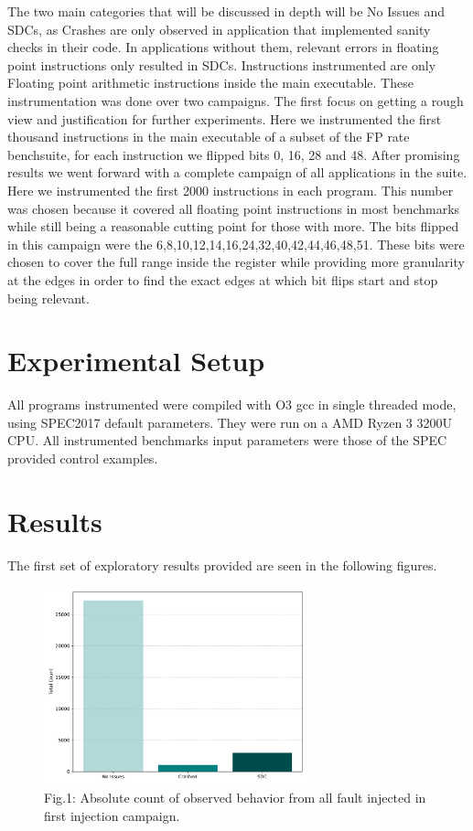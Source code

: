 \documentclass[lettersize,journal]{IEEEtran}
\begin{document}
The two main categories that will be discussed in depth will be No Issues and SDCs, as Crashes are only observed in application that implemented sanity checks in their code. In applications without them, relevant errors in floating point instructions only resulted in SDCs.
Instructions instrumented are only Floating point arithmetic instructions inside the main executable. These instrumentation was done over two campaigns. The first focus on getting a rough view and justification for further experiments. Here we instrumented the first thousand instructions in the main executable of a subset of the FP rate benchsuite, for each instruction we flipped bits 0, 16, 28 and 48. After promising results we went forward with a complete campaign of all applications in the suite. Here we instrumented the first 2000 instructions in each program. This number was chosen because it covered all floating point instructions in most benchmarks while still being a reasonable cutting point for those with more. The bits flipped in this campaign were the 6,8,10,12,14,16,24,32,40,42,44,46,48,51. These bits were chosen to cover the full range inside the register while providing more granularity at the edges in order to find the exact edges at which bit flips start and stop being relevant.
\section{Experimental Setup}
All programs instrumented were compiled with O3 gcc in single threaded mode, using SPEC2017 default parameters. They were run on a AMD Ryzen 3 3200U CPU. All instrumented benchmarks input parameters were those of the SPEC provided control examples. 

\section{Results}
The first set of exploratory results provided are seen in the following figures.

\begin{figure}[!t]
  \centering
  \includegraphics[width=3in]{plots/general_view/general_summary.pdf}
  \caption{Fig.1: Absolute count of observed behavior from all fault injected in first injection campaign.}
  \label{totals}
\end{figure}
\end{document}

